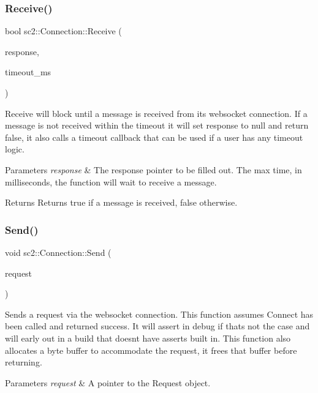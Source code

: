 \subsubsection{\texorpdfstring{Receive()}{Receive()}}
{\footnotesize\ttfamily bool sc2\+::\+Connection\+::\+Receive (\begin{DoxyParamCaption}\item[{S\+C2\+A\+P\+I\+Protocol\+::\+Response $\ast$\&}]{response,  }\item[{unsigned int}]{timeout\+\_\+ms }\end{DoxyParamCaption})}

Receive will block until a message is received from its websocket connection. If a message is not received within the timeout it will set response to null and return false, it also calls a timeout callback that can be used if a user has any timeout logic. 
\begin{DoxyParams}{Parameters}
{\em response} & The response pointer to be filled out.  The max time, in milliseconds, the function will wait to receive a message. \\
\hline
\end{DoxyParams}
\begin{DoxyReturn}{Returns}
Returns true if a message is received, false otherwise. 
\end{DoxyReturn}
\mbox{\label{classsc2_1_1_connection_af6bd305434d9efd78a6868749e764749}} 
\subsubsection{\texorpdfstring{Send()}{Send()}}
{\footnotesize\ttfamily void sc2\+::\+Connection\+::\+Send (\begin{DoxyParamCaption}\item[{const S\+C2\+A\+P\+I\+Protocol\+::\+Request $\ast$}]{request }\end{DoxyParamCaption})}

Sends a request via the websocket connection. This function assumes Connect has been called and returned success. It will assert in debug if that\textquotesingle{}s not the case and will early out in a build that doesn\textquotesingle{}t have asserts built in. This function also allocates a byte buffer to accommodate the request, it frees that buffer before returning. 
\begin{DoxyParams}{Parameters}
{\em request} & A pointer to the Request object. \\
\hline
\end{DoxyParams}
\mbox{\label{classsc2_1_1_connection_a1a3d3c532703e0bf7a88f49ee22aa65e}} 

